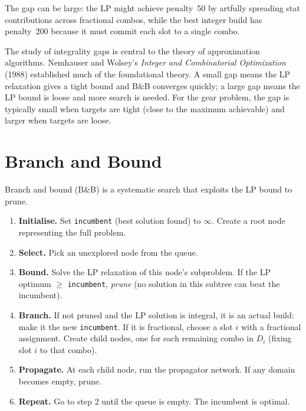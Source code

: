 \documentclass[11pt, a4paper, oneside]{book}
\begin{document}
The gap can be large: the LP might achieve penalty~50 by artfully spreading
stat contributions across fractional combos, while the best integer build has
penalty~200 because it must commit each slot to a single combo.

\begin{histbox}
The study of integrality gaps is central to the theory of approximation
algorithms.  Nemhauser and Wolsey's \emph{Integer and Combinatorial
Optimization} (1988) established much of the foundational theory.  A small
gap means the LP relaxation gives a tight bound and B\&B converges quickly;
a large gap means the LP bound is loose and more search is needed.  For the
gear problem, the gap is typically small when targets are tight (close to
the maximum achievable) and larger when targets are loose.
\end{histbox}

\section{Branch and Bound}

Branch and bound (B\&B) is a systematic search that exploits the LP bound
to prune.

\begin{defbox}[title={Branch and Bound}]
\begin{enumerate}[nosep]
  \item \textbf{Initialise.}  Set \texttt{incumbent} (best solution found)
    to $\infty$.  Create a root node representing the full problem.
  \item \textbf{Select.}  Pick an unexplored node from the queue.
  \item \textbf{Bound.}  Solve the LP relaxation of this node's subproblem.
    If the LP optimum $\geq$ \texttt{incumbent}, \emph{prune} (no solution
    in this subtree can beat the incumbent).
  \item \textbf{Branch.}  If not pruned and the LP solution is integral, it is
    an actual build: make it the new \texttt{incumbent}.  If it is fractional,
    choose a slot $i$ with a fractional assignment.  Create child nodes,
    one for each remaining combo in $D_i$ (fixing slot $i$ to that combo).
  \item \textbf{Propagate.}  At each child node, run the propagator network.
    If any domain becomes empty, prune.
  \item \textbf{Repeat.}  Go to step 2 until the queue is empty.
    The incumbent is optimal.
\end{enumerate}
\end{defbox}
\end{document}
